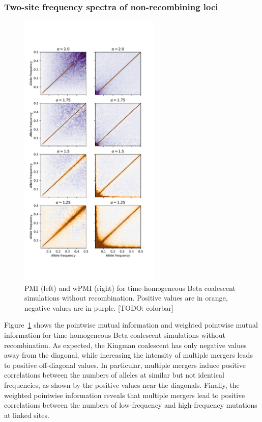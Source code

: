 \documentclass[11pt, letterpaper]{article}   	%
\newcommand{\Fig}[1]{Figure~\ref{#1}}
\begin{document}
\subsubsection{Two-site frequency spectra of non-recombining loci}

\begin{figure}
\centering
\includegraphics[width=0.6\textwidth]{figures/pmi_beta_r0.pdf}
\caption{PMI (left) and wPMI (right) for time-homogeneous Beta coalescent simulations without recombination. Positive values are in orange, negative values are in purple. [TODO: colorbar]\label{fig:pmi_beta_r0}}
\end{figure}

\Fig{fig:pmi_beta_r0} shows the pointwise mutual information and weighted pointwise mutual information for time-homogeneous Beta coalescent simulations without recombination.
As expected, the Kingman coalescent has only negative values away from the diagonal, while increasing the intensity of multiple mergers leads to positive off-diagonal values.
In particular, multiple mergers induce positive correlations between the numbers of alleles at similar but not identical frequencies, as shown by the positive values near the diagonals.
Finally, the weighted pointwise information reveals that multiple mergers lead to positive correlations between the numbers of low-frequency and high-frequency mutations at linked sites.
\end{document}
